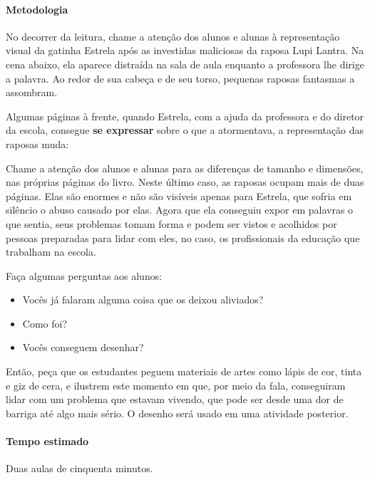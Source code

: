 \documentclass[11pt]{extarticle}
\begin{document}
\paragraph{Metodologia} No decorrer da leitura, chame a atenção dos alunos e alunas
à representação visual da gatinha Estrela após as investidas maliciosas da raposa Lupi Lantra.
Na cena abaixo, ela aparece distraída na sala de aula enquanto a professora lhe dirige a palavra.
Ao redor de sua cabeça e de seu torso, pequenas raposas fantasmas a assombram.


Algumas páginas à frente, quando Estrela, com a ajuda da professora e do diretor da escola, 
consegue \textbf{se expressar} sobre o que a atormentava, 
a representação das raposas muda:


Chame a atenção dos alunos e alunas para as diferenças de tamanho e dimensões, nas próprias páginas do livro.
Neste último caso, as raposas ocupam mais de duas páginas. Elas são enormes e não
são visíveis apenas para Estrela, que sofria em silêncio o abuso causado por elas.
Agora que ela conseguiu expor em palavras o que sentia,
seus problemas tomam forma e podem ser vistos e acolhidos por pessoas
preparadas para lidar com eles, no caso, os profissionais da educação que
trabalham na escola.

Faça algumas perguntas aos alunos:

\begin{itemize}
	\item Vocês já falaram alguma coisa que os deixou aliviados?
	\item Como foi?
	\item Vocês conseguem desenhar?
\end{itemize}

Então, peça que os estudantes peguem materiais de artes como lápis de cor, tinta e giz de cera,
e ilustrem este momento em que, por meio da fala, conseguiram lidar
com um problema que estavam vivendo, que pode ser desde uma dor de barriga
até algo mais sério. O desenho será usado em uma atividade posterior.

\paragraph{Tempo estimado} Duas aulas de cinquenta minutos.
\end{document}
